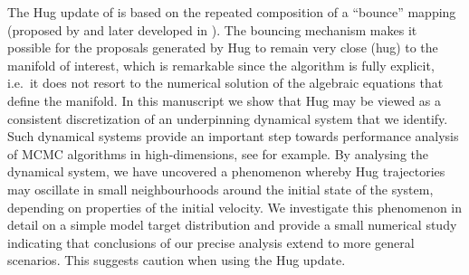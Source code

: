 \documentclass[10pt]{article}
\begin{document}
The Hug update of \cite{LS23} is based on the repeated composition of
a ``bounce'' mapping (proposed by \cite{peters2012rejection}
and later developed in \cite{bouchard2018bouncy}). The bouncing mechanism makes it possible for the proposals generated by Hug to remain very close (hug) to the manifold of interest, which is remarkable since the algorithm is fully explicit, i.e.\ it does not resort to the numerical solution of the algebraic equations that define the manifold.
In this manuscript we show that  Hug may be viewed as a consistent discretization of an underpinning dynamical system that we identify.
Such dynamical systems provide an important step towards performance analysis of MCMC algorithms
in high-dimensions, see \cite{beskos-pillai-2013} for example. By analysing the dynamical system, we have uncovered a phenomenon whereby Hug
trajectories may oscillate in small neighbourhoods around the initial
state of the system, depending on properties of the initial velocity.
We investigate this phenomenon in detail on a simple model target distribution and provide
a small numerical study indicating that conclusions of our precise
analysis extend to more general scenarios. This suggests caution when
using the Hug update.
\end{document}
